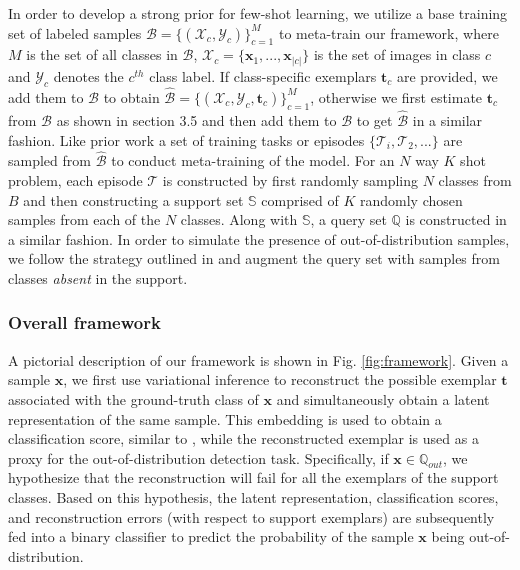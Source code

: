 In order to develop a strong prior for few-shot learning, we utilize a base training set of labeled samples $\mathcal{B}=\{(\mathcal{X}_c,\mathcal{Y}_c)\}_{c=1}^M$ to meta-train our framework, where $M$ is the set of all classes in $\mathcal{B}$, $\mathcal{X}_c=\{\mathbf{x}_1,...,\mathbf{x}_{|c|} \}$ is the set of images in class $c$ and $\mathcal{Y}_c$ denotes the $c^{th}$ class label. If class-specific exemplars $\mathbf{t}_c$ are provided, we add them to $\mathcal{B}$ to obtain $\mathcal{\hat{B}}=\{(\mathcal{X}_c,\mathcal{Y}_c,\mathbf{t}_c)\}_{c=1}^M$, otherwise we first estimate $\mathbf{t}_c$ from $\mathcal{B}$ as shown in section 3.5 and then add them to $\mathcal{B}$ to get $\mathcal{\hat{B}}$ in a similar fashion. Like prior work \cite{proto_net,match_net} a set of training tasks or episodes $\{\mathcal{T}_i,\mathcal{T}_2,... \}$ are sampled from $\mathcal{\hat{B}}$ to conduct meta-training of the model. 
For an $N$ way $K$ shot problem, each episode $\mathcal{T}$ is constructed by first randomly sampling $N$ classes from $B$ and then constructing a support set $\mathbb{S}$ comprised of $K$ randomly chosen samples from each of the $N$ classes. Along with $\mathbb{S}$, a query set $\mathbb{Q}$ is constructed in a similar fashion. In order to simulate the presence of out-of-distribution samples, we follow the strategy outlined in \cite{peeler} and augment the query set with samples from classes \textit{absent} in the support.

\subsubsection*{Overall framework}
 A pictorial description of our framework is shown in Fig. \ref{fig:framework}. Given a sample $\mathbf{x}$, we first use variational inference to reconstruct the possible exemplar $\mathbf{t}$ associated with the ground-truth class of $\mathbf{x}$ and simultaneously obtain a latent representation of the same sample. This embedding is used to obtain a classification score, similar to \cite{chen2020new,match_net}, while the reconstructed exemplar is used as a proxy for the out-of-distribution detection task. Specifically, if $\mathbf{x} \in \mathbb{Q}_{out}$, we hypothesize that the reconstruction will fail for all the exemplars of the support classes. Based on this hypothesis, the latent representation, classification scores, and reconstruction errors (with respect to support exemplars) are subsequently fed into a binary classifier to predict the probability of the sample $\mathbf{x}$ being out-of-distribution. 
 

